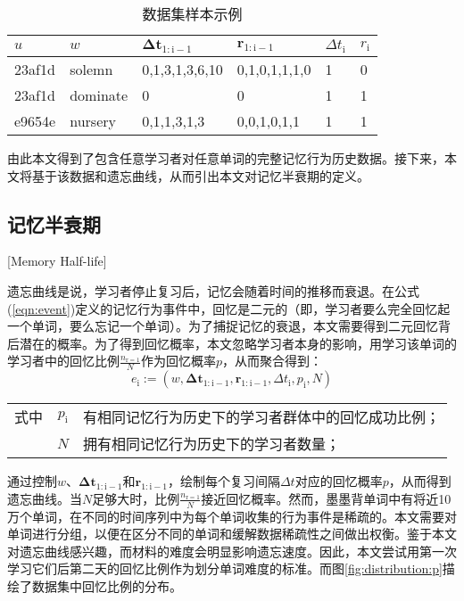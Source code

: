 \begin{table}[htbp]
    \caption{数据集样本示例}
    \label{tab:raw}
    \vspace{0.5em}\centering\wuhao
    \begin{tabular}{llllll}
    \toprule[1.5pt]
    $u$    & $w$      & $\bm{\Delta t_\mathrm{1:i-1}}$ & $\bm r_\mathrm{1:i-1}$ & $\Delta t_\mathrm{i}$ & $r_\mathrm{i}$ \\ 
    \midrule[1pt]
    23af1d & solemn   & 0,1,3,1,3,6,10                  & 0,1,0,1,1,1,0           & 1            & 0 \\
    23af1d & dominate & 0                               & 0                       & 1            & 1 \\
    e9654e & nursery  & 0,1,1,3,1,3                     & 0,0,1,0,1,1             & 1            & 1 \\ 
    \bottomrule[1.5pt]
    \end{tabular}
\end{table}

由此本文得到了包含任意学习者对任意单词的完整记忆行为历史数据。接下来，本文将基于该数据和遗忘曲线，从而引出本文对记忆半衰期的定义。

\subsection{记忆半衰期}[Memory Half-life]

遗忘曲线是说，学习者停止复习后，记忆会随着时间的推移而衰退。在公式(\ref{eqn:event})定义的记忆行为事件中，回忆是二元的（即，学习者要么完全回忆起一个单词，要么忘记一个单词）。为了捕捉记忆的衰退，本文需要得到二元回忆背后潜在的概率。为了得到回忆概率，本文忽略学习者本身的影响，用学习该单词的学习者中的回忆比例$\frac{n_\mathrm{r=1}}{N}$作为回忆概率$p$，从而聚合得到：
\begin{equation}
e_\mathrm{i} :=(w, \bm{\Delta t}_\mathrm{1:i-1}, \bm r_\mathrm{1:i-1}, \Delta t_\mathrm{i} , p_\mathrm{i}, N)
\end{equation}
\begin{tabularx}{\textwidth}{@{}l@{\quad}r@{———}X@{}}
    式中& $p_\mathrm{i}$ &有相同记忆行为历史下的学习者群体中的回忆成功比例；\\
    &  $N$ &拥有相同记忆行为历史下的学习者数量；
\end{tabularx}\vspace{3.15bp}

通过控制$w$、$\bm{\Delta t}_\mathrm{1:i-1}$和$\bm r_\mathrm{1:i-1}$，绘制每个复习间隔$\Delta t$对应的回忆概率$p$，从而得到遗忘曲线。当$N$足够大时，比例$\frac{n_\mathrm{r=1}}{N}$接近回忆概率。然而，墨墨背单词中有将近10万个单词，在不同的时间序列中为每个单词收集的行为事件是稀疏的。本文需要对单词进行分组，以便在区分不同的单词和缓解数据稀疏性之间做出权衡。鉴于本文对遗忘曲线感兴趣，而材料的难度会明显影响遗忘速度。因此，本文尝试用第一次学习它们后第二天的回忆比例作为划分单词难度的标准。而图\ref{fig:distribution:p}描绘了数据集中回忆比例的分布。

